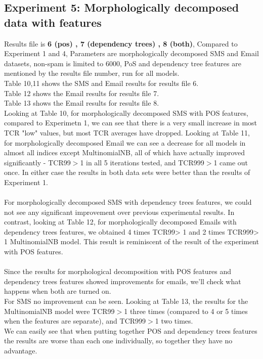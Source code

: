 \documentclass[11pt,a4paper]{article}
\begin{document}
\subsection{Experiment 5: Morphologically decomposed data with features}
\label{ssec:Experiment 5}
Results file is \textbf{6 (pos) , 7 (dependency trees) , 8 (both)}, Compared to Experiment 1 and 4, Parameters are morphologically decomposed SMS and Email datasets, non-spam is limited to 6000, PoS and dependency tree features are mentioned by the results file number, run for all models.\\
Table 10,11 shows the SMS and Email results for results file 6.\\
Table 12 shows the Email results for results file 7.\\
Table 13 shows the Email results for results file 8.\\
Looking at Table 10, for morphologically decomposed SMS with POS features, compared to Experimetn 1, we can see that there is a very small increase in most TCR "low" values, but most TCR averages have dropped.
Looking at Table 11, for morphologically decomposed Email we can see a decrease for all models in almost all indices except MultinomialNB, all of which have actually improved significantly - TCR99${>}$1 in all 5 iterations tested, and TCR999${>}$1 came out once.
In either case the results in both data sets were better than the results of Experiment 1.\\\\
For morphologically decomposed SMS with dependency trees features, we could not see any significant improvement over previous experimental results.
In contrast, looking at Table 12, for morphologically decomposed Emails with dependency trees features, we obtained 4 times TCR99> 1 and 2 times TCR999> 1 MultinomialNB model. This result is reminiscent of the result of the experiment with POS features.\\\\
Since the results for morphological decomposition with POS features and dependency trees features showed improvements for emails, we'll check what happens when both are turned on.\\
For SMS no improvement can be seen.
Looking at Table 13, the results for the MultinomialNB model were TCR99${>}$1 three times (compared to 4 or 5 times when the features are separate), and TCR999${>}$1 two times.\\
We can easily see that when putting together POS and dependency trees features the results are worse than each one individually, so together they have no advantage.\\\\
\end{document}
